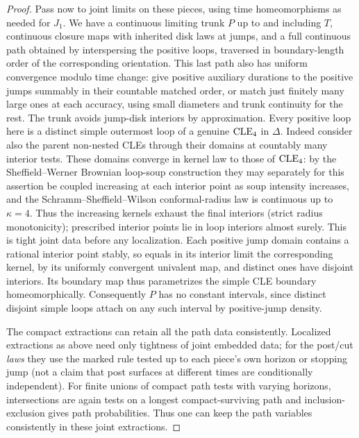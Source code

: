 \begin{proof}
Pass now to joint limits on these pieces, using time homeomorphisms as needed for \(J_1\).
We have a continuous limiting trunk \(P\) up to and including \(T\), continuous closure maps with inherited disk laws at jumps, and a full continuous path obtained by interspersing the positive loops, traversed in boundary-length order of the corresponding orientation.
This last path also has uniform convergence modulo time change: give positive auxiliary durations to the positive jumps summably in their countable matched order, or match just finitely many large ones at each accuracy, using small diameters and trunk continuity for the rest.
The trunk avoids jump-disk interiors by approximation.
Every positive loop here is a distinct simple outermost loop of a genuine \({\rm CLE}_4\) in \(\Delta\).
Indeed consider also the parent non-nested CLEs through their domains at countably many interior tests.
These domains converge in kernel law to those of \({\rm CLE}_4\): by the Sheffield--Werner Brownian loop-soup construction \citep{SWcle} they may separately for this assertion be coupled increasing at each interior point as soup intensity increases, and the Schramm--Sheffield--Wilson conformal-radius law \citep{SSWradii} is continuous up to \(\kappa=4\).
Thus the increasing kernels exhaust the final interiors (strict radius monotonicity); prescribed interior points lie in loop interiors almost surely.
This is tight joint data before any localization.
Each positive jump domain contains a rational interior point stably, so equals in its interior limit the corresponding kernel, by its uniformly convergent univalent map, and distinct ones have disjoint interiors.
Its boundary map thus parametrizes the simple CLE boundary homeomorphically.
Consequently \(P\) has no constant intervals, since distinct disjoint simple loops attach on any such interval by positive-jump density.



The compact extractions can retain all the path data consistently.
Localized extractions as above need only tightness of joint embedded data; for the post/cut \emph{laws} they use the marked rule tested up to each piece's own horizon or stopping jump (not a claim that post surfaces at different times are conditionally independent).
For finite unions of compact path tests with varying horizons, intersections are again tests on a longest compact-surviving path and inclusion-exclusion gives path probabilities.
Thus one can keep the path variables consistently in these joint extractions.

\end{proof}

